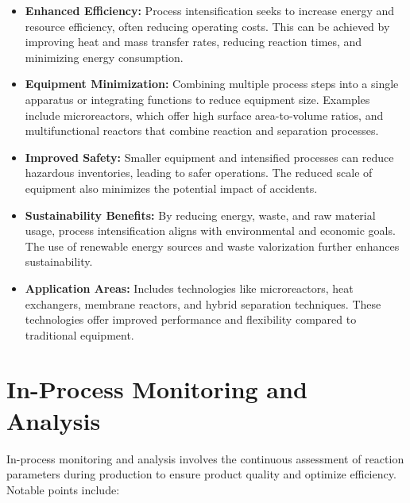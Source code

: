 \documentclass[11pt]{article}
\begin{document}
\begin{itemize}
    \item \textbf{Enhanced Efficiency:} Process intensification seeks to increase energy and resource efficiency, often reducing operating costs. This can be achieved by improving heat and mass transfer rates, reducing reaction times, and minimizing energy consumption.
    \item \textbf{Equipment Minimization:} Combining multiple process steps into a single apparatus or integrating functions to reduce equipment size. Examples include microreactors, which offer high surface area-to-volume ratios, and multifunctional reactors that combine reaction and separation processes.
    \item \textbf{Improved Safety:} Smaller equipment and intensified processes can reduce hazardous inventories, leading to safer operations. The reduced scale of equipment also minimizes the potential impact of accidents.
    \item \textbf{Sustainability Benefits:} By reducing energy, waste, and raw material usage, process intensification aligns with environmental and economic goals. The use of renewable energy sources and waste valorization further enhances sustainability.
    \item \textbf{Application Areas:} Includes technologies like microreactors, heat exchangers, membrane reactors, and hybrid separation techniques. These technologies offer improved performance and flexibility compared to traditional equipment.
\end{itemize}

\section{In-Process Monitoring and Analysis}
In-process monitoring and analysis involves the continuous assessment of reaction parameters during production to ensure product quality and optimize efficiency. Notable points include:
\end{document}
